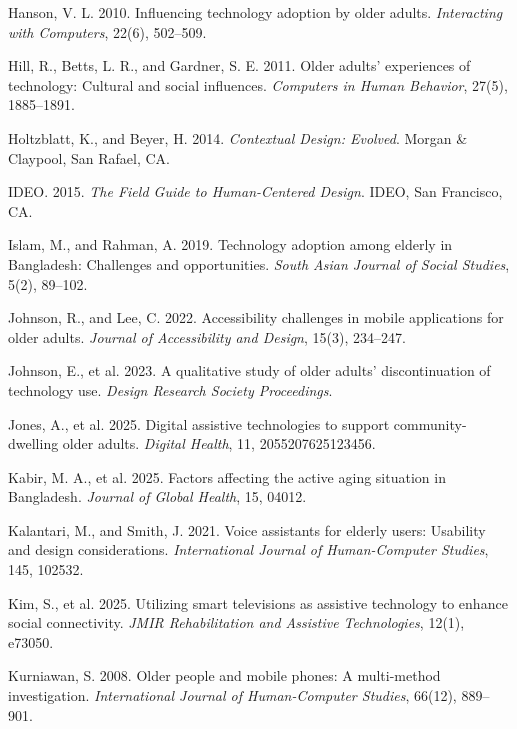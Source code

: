 \documentclass[acmlarge]{acmart}
\begin{document}
{\begin{thebibliography}{50}
Hanson, V. L. 2010. Influencing technology adoption by older adults. \textit{Interacting with Computers}, 22(6), 502--509.

Hill, R., Betts, L. R., and Gardner, S. E. 2011. Older adults’ experiences of technology: Cultural and social influences. \textit{Computers in Human Behavior}, 27(5), 1885--1891.

Holtzblatt, K., and Beyer, H. 2014. \textit{Contextual Design: Evolved}. Morgan \& Claypool, San Rafael, CA.

IDEO. 2015. \textit{The Field Guide to Human-Centered Design}. IDEO, San Francisco, CA.

Islam, M., and Rahman, A. 2019. Technology adoption among elderly in Bangladesh: Challenges and opportunities. \textit{South Asian Journal of Social Studies}, 5(2), 89--102.

Johnson, R., and Lee, C. 2022. Accessibility challenges in mobile applications for older adults. \textit{Journal of Accessibility and Design}, 15(3), 234--247.

Johnson, E., et al. 2023. A qualitative study of older adults' discontinuation of technology use. \textit{Design Research Society Proceedings}.

Jones, A., et al. 2025. Digital assistive technologies to support community-dwelling older adults. \textit{Digital Health}, 11, 2055207625123456.

Kabir, M. A., et al. 2025. Factors affecting the active aging situation in Bangladesh. \textit{Journal of Global Health}, 15, 04012.

Kalantari, M., and Smith, J. 2021. Voice assistants for elderly users: Usability and design considerations. \textit{International Journal of Human-Computer Studies}, 145, 102532.

Kim, S., et al. 2025. Utilizing smart televisions as assistive technology to enhance social connectivity. \textit{JMIR Rehabilitation and Assistive Technologies}, 12(1), e73050.

Kurniawan, S. 2008. Older people and mobile phones: A multi-method investigation. \textit{International Journal of Human-Computer Studies}, 66(12), 889--901.


\end{thebibliography}}
\end{document}
